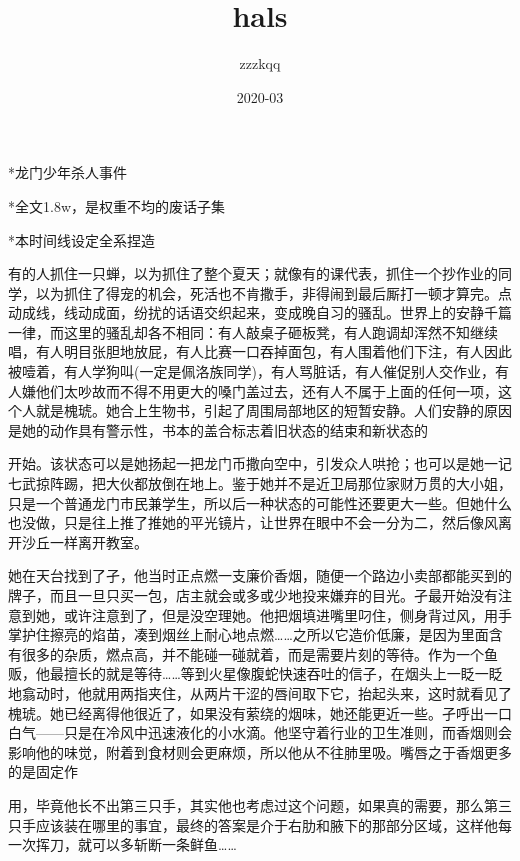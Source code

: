 \documentclass{article}
\title{hals}
\author{zzzkqq}
\date{2020-03}
\begin{document}

\maketitle


\Large

﻿*龙门少年杀人事件

*全文1.8w，是权重不均的废话子集

*本时间线设定全系捏造

有的人抓住一只蝉，以为抓住了整个夏天；就像有的课代表，抓住一个抄作业的同学，以为抓住了得宠的机会，死活也不肯撒手，非得闹到最后厮打一顿才算完。点动成线，线动成面，纷扰的话语交织起来，变成晚自习的骚乱。世界上的安静千篇一律，而这里的骚乱却各不相同：有人敲桌子砸板凳，有人跑调却浑然不知继续唱，有人明目张胆地放屁，有人比赛一口吞掉面包，有人围着他们下注，有人因此被噎着，有人学狗叫(一定是佩洛族同学)，有人骂脏话，有人催促别人交作业，有人嫌他们太吵故而不得不用更大的嗓门盖过去，还有人不属于上面的任何一项，这个人就是槐琥。她合上生物书，引起了周围局部地区的短暂安静。人们安静的原因是她的动作具有警示性，书本的盖合标志着旧状态的结束和新状态的

\newpage 

开始。该状态可以是她扬起一把龙门币撒向空中，引发众人哄抢；也可以是她一记七武掠阵踢，把大伙都放倒在地上。鉴于她并不是近卫局那位家财万贯的大小姐，只是一个普通龙门市民兼学生，所以后一种状态的可能性还要更大一些。但她什么也没做，只是往上推了推她的平光镜片，让世界在眼中不会一分为二，然后像风离开沙丘一样离开教室。

她在天台找到了孑，他当时正点燃一支廉价香烟，随便一个路边小卖部都能买到的牌子，而且一旦只买一包，店主就会或多或少地投来嫌弃的目光。孑最开始没有注意到她，或许注意到了，但是没空理她。他把烟填进嘴里叼住，侧身背过风，用手掌护住擦亮的焰苗，凑到烟丝上耐心地点燃……之所以它造价低廉，是因为里面含有很多的杂质，燃点高，并不能碰一碰就着，而是需要片刻的等待。作为一个鱼贩，他最擅长的就是等待……等到火星像腹蛇快速吞吐的信子，在烟头上一眨一眨地翕动时，他就用两指夹住，从两片干涩的唇间取下它，抬起头来，这时就看见了槐琥。她已经离得他很近了，如果没有萦绕的烟味，她还能更近一些。孑呼出一口白气——只是在冷风中迅速液化的小水滴。他坚守着行业的卫生准则，而香烟则会影响他的味觉，附着到食材则会更麻烦，所以他从不往肺里吸。嘴唇之于香烟更多的是固定作

\newpage 

用，毕竟他长不出第三只手，其实他也考虑过这个问题，如果真的需要，那么第三只手应该装在哪里的事宜，最终的答案是介于右肋和腋下的那部分区域，这样他每一次挥刀，就可以多斩断一条鲜鱼……
\end{document}
